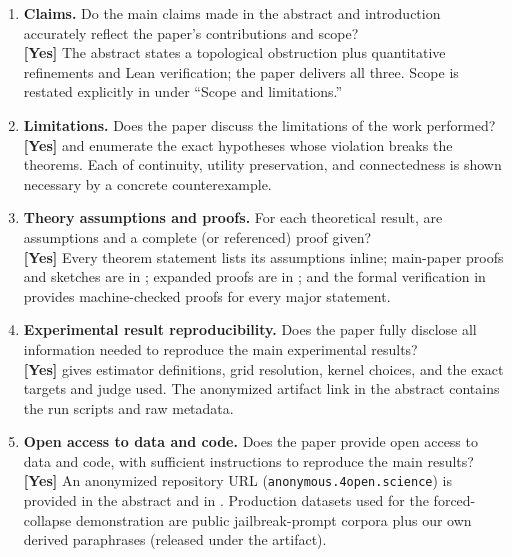 \begin{enumerate}[leftmargin=1.9em,itemsep=0.25em]

\item \textbf{Claims.} Do the main claims made in the abstract and
introduction accurately reflect the paper's contributions and scope?
\\\textbf{[Yes]} The abstract states a topological obstruction plus
quantitative refinements and Lean verification; the paper delivers
all three. Scope is restated explicitly in
 under ``Scope and limitations.''

\item \textbf{Limitations.} Does the paper discuss the limitations of
the work performed?
\\\textbf{[Yes]}  and
 enumerate the exact hypotheses whose
violation breaks the theorems. Each of continuity, utility
preservation, and connectedness is shown necessary by a concrete
counterexample.

\item \textbf{Theory assumptions and proofs.} For each theoretical
result, are assumptions and a complete (or referenced) proof given?
\\\textbf{[Yes]} Every theorem statement lists its assumptions
inline; main-paper proofs and sketches are in
;
expanded proofs are in ; and the formal
verification in  provides machine-checked proofs
for every major statement.

\item \textbf{Experimental result reproducibility.} Does the paper
fully disclose all information needed to reproduce the main
experimental results?
\\\textbf{[Yes]}  gives estimator
definitions, grid resolution, kernel choices, and the exact targets
and judge used. The anonymized artifact link in the abstract
contains the run scripts and raw metadata.

\item \textbf{Open access to data and code.} Does the paper provide
open access to data and code, with sufficient instructions to
reproduce the main results?
\\\textbf{[Yes]} An anonymized repository URL
(\texttt{anonymous.4open.science}) is provided in the abstract and
in . Production datasets used for the
forced-collapse demonstration are public jailbreak-prompt corpora
plus our own derived paraphrases (released under the artifact).


\end{enumerate}
